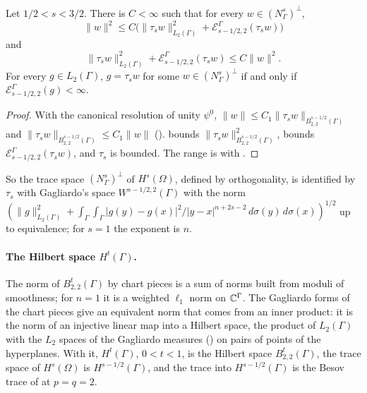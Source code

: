 \begin{theorem}
\label{thm:trace-space-slobodeckij}
\leanok
{}
Let $1/2 < s < 3/2$. There is $C < \infty$ such that for every $w \in (N^s_\Gamma)^\perp$,
\[
  \|w\|^2 \leq C \bigl( \|\tau_s w\|_{L_2(\Gamma)}^2 + \mathcal{E}^\Gamma_{s-1/2,2}(\tau_s w) \bigr)
\]
and
\[
  \|\tau_s w\|_{L_2(\Gamma)}^2 + \mathcal{E}^\Gamma_{s-1/2,2}(\tau_s w) \leq C \|w\|^2 .
\]
For every $g \in L_2(\Gamma)$, $g = \tau_s w$ for some $w \in (N^s_\Gamma)^\perp$ if and only if
$\mathcal{E}^\Gamma_{s-1/2,2}(g) < \infty$.
\end{theorem}

\begin{proof}
\leanok
With the canonical resolution of unity $\psi^0$,
$\|w\| \leq C_1 \|\tau_s w\|_{B^{s-1/2}_{2,2}(\Gamma)}$ and
$\|\tau_s w\|_{B^{s-1/2}_{2,2}(\Gamma)} \leq C_1 \|w\|$ ().
 bounds $\|\tau_s w\|_{B^{s-1/2}_{2,2}(\Gamma)}^2$,
 bounds $\mathcal{E}^\Gamma_{s-1/2,2}(\tau_s w)$, and
$\tau_s$ is bounded. The range is  with
.
\end{proof}

So the trace space $(N^s_\Gamma)^\perp$ of $H^s(\Omega)$, defined by orthogonality, is identified
by $\tau_s$ with Gagliardo's space $W^{s-1/2,2}(\Gamma)$ with the norm
$(\|g\|_{L_2(\Gamma)}^2 + \int_\Gamma \int_\Gamma |g(y) - g(x)|^2 / |y - x|^{n + 2s - 2} \,
d\sigma(y) \, d\sigma(x))^{1/2}$ up to equivalence; for $s = 1$ the exponent is $n$.

\paragraph{The Hilbert space $H^t(\Gamma)$.}
The norm of $B^t_{2,2}(\Gamma)$ by chart pieces is a sum of norms built from moduli of
smoothness; for $n = 1$ it is a weighted $\ell_1$ norm on $\mathbb{C}^\Gamma$. The Gagliardo forms of the
chart pieces give an equivalent norm that comes from an inner product: it is the norm of an
injective linear map into a Hilbert space, the product of $L_2(\Gamma)$ with the $L_2$ spaces of
the Gagliardo measures () on pairs of points of the hyperplanes.
With it, $H^t(\Gamma)$, $0 < t < 1$, is the Hilbert space $B^t_{2,2}(\Gamma)$, the trace space of
$H^s(\Omega)$ is $H^{s-1/2}(\Gamma)$, and the trace into $H^{s-1/2}(\Gamma)$ is the Besov trace of
 at $p = q = 2$.


